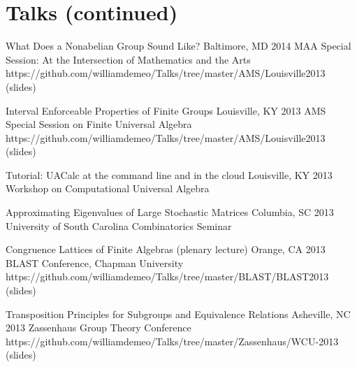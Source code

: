     \newpage

        \section{\mysidestyle Talks (continued)}


\talkurl
    {What Does a Nonabelian Group Sound Like?}
    {Baltimore, MD 2014}
    {MAA Special Session: At the Intersection of Mathematics and the Arts} 
    {https://github.com/williamdemeo/Talks/tree/master/AMS/Louisville2013}
    {(slides)}
    
    \vspace{\vsp}

\talkurl
    {Interval Enforceable Properties of Finite Groups}
    {Louisville, KY 2013} %
    {AMS Special Session on Finite Universal Algebra}
    {https://github.com/williamdemeo/Talks/tree/master/AMS/Louisville2013}
    {(slides)}

    \vspace{\vsp}

\talk
    {Tutorial: UACalc at the command line and in the cloud}
    {Louisville, KY 2013}
    {Workshop on Computational Universal Algebra} 

    \vspace{\vsp}

\talk
    {Approximating Eigenvalues of Large Stochastic Matrices}
    {Columbia, SC 2013}
    {University of South Carolina Combinatorics Seminar}  

    \vspace{\vsp}

\talkurl
    {Congruence Lattices of Finite Algebras (plenary lecture)}
    {Orange, CA 2013}
    {BLAST Conference, Chapman University} 
    {https://github.com/williamdemeo/Talks/tree/master/BLAST/BLAST2013}
    {(slides)}

    \vspace{\vsp}

\talkurl
    {Transposition Principles for Subgroups and Equivalence Relations}
    {Asheville, NC 2013} %
    {Zassenhaus Group Theory Conference}  
    {https://github.com/williamdemeo/Talks/tree/master/Zassenhaus/WCU-2013}
    {(slides)}

    \vspace{\vsp}

